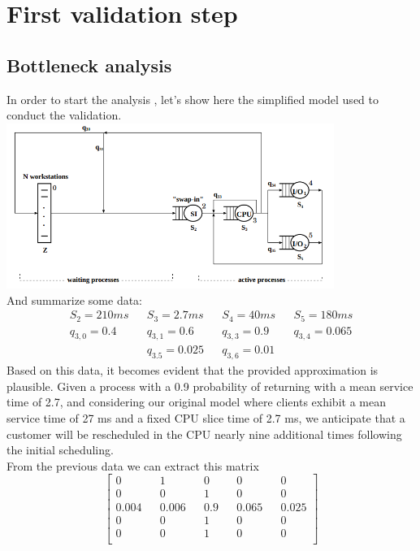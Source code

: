 \documentclass[12pt,a4paper]{article}
\begin{document}
\section{First validation step}
\subsection{Bottleneck analysis}
In order to start the analysis , let's show here the simplified model
used to conduct the validation.
\includegraphics[width=0.8\textwidth]{Images/simplified_model.png}
\\And summarize some data:
\begin{displaymath}
    \begin{aligned}
        S_2 = 210ms  &  & S_3= 2.7ms     &  & S_4 = 40ms    &  & S_5=180ms      \\
        q_{3,0}= 0.4 &  & q_{3,1}=0.6    &  & q_{3,3} = 0.9 &  & q_{3,4}= 0.065 \\
                     &  & q_{3.5}= 0.025 &  & q_{3,6}=0.01  &  &
    \end{aligned}
\end{displaymath}
Based on this data, it becomes evident that the provided approximation is plausible. Given a process with a 0.9 probability of returning with a mean service time of 2.7, and considering our original model where clients exhibit a mean service time of 27 ms and a fixed CPU slice time of 2.7 ms, we anticipate that a customer will be rescheduled in the CPU nearly nine additional times following the initial scheduling. \\

From the previous data we can extract this matrix
\begin{displaymath}
    \begin{bmatrix}
        0     &  & 1     &  & 0   &  & 0     &  & 0     \\
        0     &  & 0     &  & 1   &  & 0     &  & 0     \\
        0.004 &  & 0.006 &  & 0.9 &  & 0.065 &  & 0.025 \\
        0     &  & 0     &  & 1   &  & 0     &  & 0     \\
        0     &  & 0     &  & 1   &  & 0     &  & 0     \\
    \end{bmatrix}
\end{displaymath}
\end{document}

